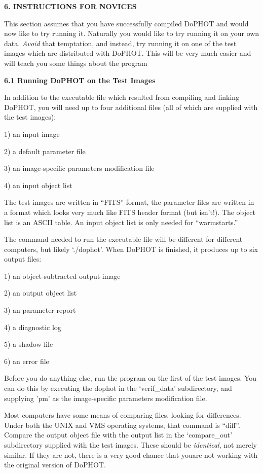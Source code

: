 \centerline{\bf 6. INSTRUCTIONS FOR NOVICES}

This section assumes that you have successfully compiled
DoPHOT and would now like to try running it. Naturally
you would like to try running it on your own data.
{\it Avoid} that temptation, and instead, try running it
on one of the test images which are distributed with
DoPHOT. This will be very much easier and will teach
you some things about the program

\centerline{\bf 6.1  Running DoPHOT on the Test Images}

In addition to the executable file which resulted from
compiling and linking DoPHOT, you will need up to four additional
files (all of which are supplied with the test images):

\item{1)} an input image
\item{2)} a default parameter file
\item{3)} an image-specific parameters modification file
\item{4)} an input object list

The test images are written in ``FITS'' format, the parameter
files are written in a format which looks very much like FITS header
format (but isn't!).  
The object list is an ASCII table.  An input object list is only 
needed for ``warmstarts.''

The command needed to run the executable file will be different
for different computers, but likely `./dophot'.  When DoPHOT is 
finished, it produces up to six output files:
\item{1)} an object-subtracted output image
\item{2)} an output object list
\item{3)} an parameter report
\item{4)} a diagnostic log
\item{5)} a shadow file
\item{6)} an error file

Before you do anything else, run the program on the first of the test
images.  
You can do this by executing the dophot in the `verif\_data'
subdirectory, and supplying 'pm' as the image-specific parameters 
modification file.

Most computers have some means of comparing files, looking
for differences.  Under both the UNIX and VMS operating systems, that
command is ``diff''.  Compare the output object file with the output list in 
the `compare\_out' subdirectory supplied with the test images.  These 
should be {\it identical}, not merely similar.  If they are not, there is a very 
good chance that youare not working with the original version of DoPHOT.

